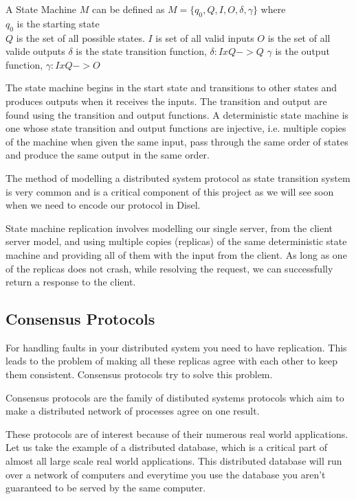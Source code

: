 A State Machine $M$ can be defined as $M = \lbrace q_0, Q, I, O, \delta, \gamma \rbrace$ where \\
$q_0$ is the starting state \\
$Q$ is the set of all possible states.
$I$ is set of all valid inputs
$O$ is the set of all valide outputs
$\delta$ is the state transition function, $\delta : I x Q -> Q$
$\gamma$ is the output function, $\gamma : I x Q -> O$

The state machine begins in the start state and transitions to other states and
produces outputs when it receives the inputs. The transition and output are found
using the transition and output functions. A deterministic state machine is one
whose state transition and output functions are injective, i.e. multiple
copies of the machine when given the same input, pass through the same order of states
and produce the same output in the same order.

The method of modelling a distributed system protocol as state transition system
is very common and is a critical component of this project as we will see soon when
we need to encode our protocol in Disel.

State machine replication involves modelling our single server, from the client
server model, and using multiple copies (replicas) of the same deterministic
state machine and providing all of them with the input from the client.
As long as one of the replicas does not crash, while resolving the request,
we can successfully return a response to the client.


\subsection{Consensus Protocols}
For handling faults in your distributed system you need to have replication.
This leads to the problem of making all these replicas agree with each other
to keep them consistent. Consensus protocols try to solve this problem.

Consensus protocols are the family of distibuted systems protocols which aim to
make a distributed network of processes agree on one result.

These protocols are of interest because of their numerous real world applications.
Let us take the example of a distributed database, which is a critical part of almost
all large scale real world applications. This distributed database will run
over a network of computers and everytime you use the database you aren't guaranteed
to be served by the same computer.

